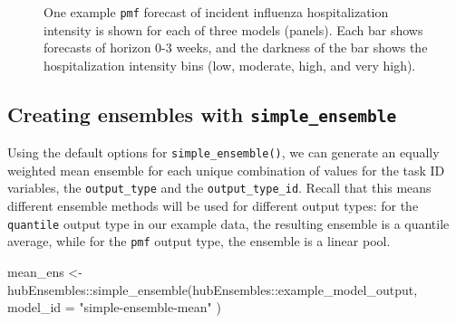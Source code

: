\documentclass[
]{article}
\newenvironment{Shaded}{\begin{snugshade}}{\end{snugshade}}
\newcommand{\AttributeTok}[1]{\textcolor[rgb]{0.40,0.45,0.13}{#1}}
\newcommand{\FunctionTok}[1]{\textcolor[rgb]{0.28,0.35,0.67}{#1}}
\newcommand{\NormalTok}[1]{\textcolor[rgb]{0.00,0.23,0.31}{#1}}
\newcommand{\OtherTok}[1]{\textcolor[rgb]{0.00,0.23,0.31}{#1}}
\newcommand{\SpecialCharTok}[1]{\textcolor[rgb]{0.37,0.37,0.37}{#1}}
\newcommand{\StringTok}[1]{\textcolor[rgb]{0.13,0.47,0.30}{#1}}
\begin{document}
\begin{figure}


\caption{\label{fig-plot-ex-mods-pmf}One example \texttt{pmf} forecast
of incident influenza hospitalization intensity is shown for each of
three models (panels). Each bar shows forecasts of horizon 0-3 weeks,
and the darkness of the bar shows the hospitalization intensity bins
(low, moderate, high, and very high).}

\end{figure}%

\subsection{\texorpdfstring{Creating ensembles with
\texttt{simple\_ensemble}}{Creating ensembles with simple\_ensemble}}\label{creating-ensembles-with-simple_ensemble}

Using the default options for \texttt{simple\_ensemble()}, we can
generate an equally weighted mean ensemble for each unique combination
of values for the task ID variables, the \texttt{output\_type} and the
\texttt{output\_type\_id}. Recall that this means different ensemble
methods will be used for different output types: for the
\texttt{quantile} output type in our example data, the resulting
ensemble is a quantile average, while for the \texttt{pmf} output type,
the ensemble is a linear pool.

\begin{Shaded}
\begin{Highlighting}[]
\NormalTok{mean\_ens }\OtherTok{\textless{}{-}}\NormalTok{ hubEnsembles}\SpecialCharTok{::}\FunctionTok{simple\_ensemble}\NormalTok{(hubEnsembles}\SpecialCharTok{::}\NormalTok{example\_model\_output,}
  \AttributeTok{model\_id =} \StringTok{"simple{-}ensemble{-}mean"}
\NormalTok{)}
\end{Highlighting}
\end{Shaded}
\end{document}
